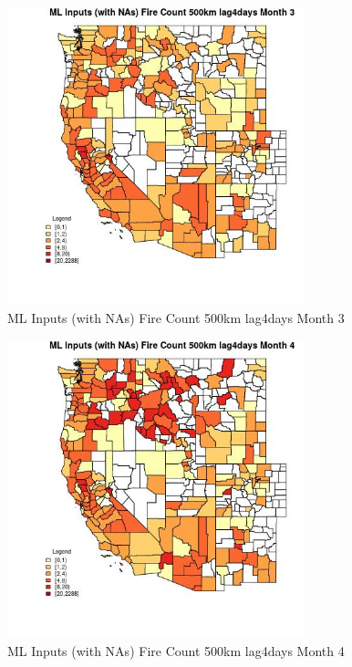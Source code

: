 \clearpage 

\begin{figure} 
\centering  
\includegraphics[width=0.77\textwidth]{Code_Outputs/Report_ML_input_PM25_Step4_part_e_de_duplicated_aves_compiled_2019-05-20wNAs_CountyFire_Count_500km_lag4daysmedianMonth3.jpg} 
\caption{\label{fig:Report_ML_input_PM25_Step4_part_e_de_duplicated_aves_compiled_2019-05-20wNAsCountyFire_Count_500km_lag4daysmedianMonth3}ML Inputs (with NAs) Fire Count 500km lag4days Month 3} 
\end{figure} 
 

\begin{figure} 
\centering  
\includegraphics[width=0.77\textwidth]{Code_Outputs/Report_ML_input_PM25_Step4_part_e_de_duplicated_aves_compiled_2019-05-20wNAs_CountyFire_Count_500km_lag4daysmedianMonth4.jpg} 
\caption{\label{fig:Report_ML_input_PM25_Step4_part_e_de_duplicated_aves_compiled_2019-05-20wNAsCountyFire_Count_500km_lag4daysmedianMonth4}ML Inputs (with NAs) Fire Count 500km lag4days Month 4} 
\end{figure} 
 

